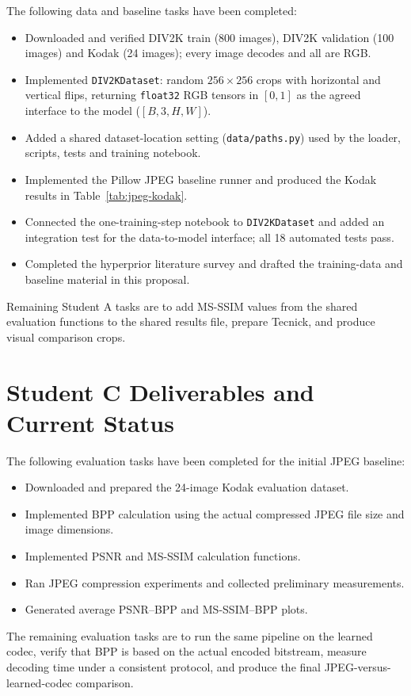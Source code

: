 \documentclass[11pt]{article}
\begin{document}
The following data and baseline tasks have been completed:
\begin{itemize}[leftmargin=*]
    \item Downloaded and verified DIV2K train (800 images), DIV2K validation
    (100 images) and Kodak (24 images); every image decodes and all are RGB.
    \item Implemented \texttt{DIV2KDataset}: random $256\times256$ crops with
    horizontal and vertical flips, returning \texttt{float32} RGB tensors in
    $[0,1]$ as the agreed interface to the model ($[B,3,H,W]$).
    \item Added a shared dataset-location setting (\texttt{data/paths.py}) used by
    the loader, scripts, tests and training notebook.
    \item Implemented the Pillow JPEG baseline runner and produced the Kodak
    results in Table~\ref{tab:jpeg-kodak}.
    \item Connected the one-training-step notebook to \texttt{DIV2KDataset} and
    added an integration test for the data-to-model interface; all 18 automated
    tests pass.
    \item Completed the hyperprior literature survey and drafted the training-data
    and baseline material in this proposal.
\end{itemize}

Remaining Student A tasks are to add MS-SSIM values from the shared evaluation
functions to the shared results file, prepare Tecnick, and produce visual
comparison crops.

\section{Student C Deliverables and Current Status}

The following evaluation tasks have been completed for the initial
JPEG baseline:
\begin{itemize}[leftmargin=*]
    \item Downloaded and prepared the 24-image Kodak evaluation dataset.
    \item Implemented BPP calculation using the actual compressed
    JPEG file size and image dimensions.
    \item Implemented PSNR and MS-SSIM calculation functions.
    \item Ran JPEG compression experiments and collected preliminary
    measurements.
    \item Generated average PSNR--BPP and MS-SSIM--BPP plots.
\end{itemize}

The remaining evaluation tasks are to run the same pipeline on the
learned codec, verify that BPP is based on the actual encoded
bitstream, measure decoding time under a consistent protocol, and
produce the final JPEG-versus-learned-codec comparison.



\end{document}
